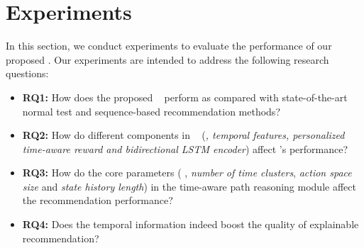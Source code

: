 \section{Experiments}
\label{exper}

In this section, we conduct experiments to evaluate the performance of our proposed \tkgrec.  Our experiments are intended to address the following research questions:

\begin{itemize}
\item \textbf{RQ1:} How does the proposed \tkgrec~ perform as compared with state-of-the-art normal test and sequence-based recommendation methods?

\item \textbf{RQ2:} How do different components in \tkgrec~ (\textit{\ie,
temporal features,
personalized time-aware reward and
bidirectional LSTM encoder}) affect \tkgrec's performance?

\item \textbf{RQ3:} How do the core parameters ( \ie, \textit{number of time clusters}, \textit{action space size} and \textit{
state history length}) in the time-aware path reasoning module affect the recommendation performance?

\item \textbf{RQ4:} Does the temporal information indeed boost the quality of explainable recommendation?
\end{itemize}



